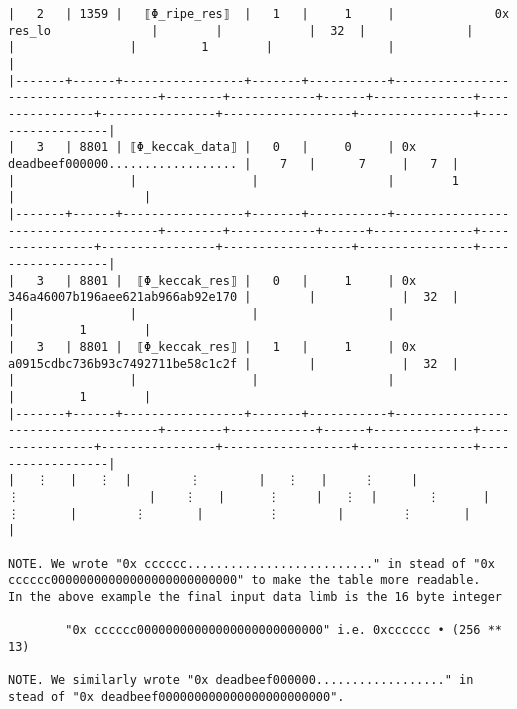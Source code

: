 \documentclass[varwidth=\maxdimen,margin=0.5cm,multi={verbatim}]{standalone}
\begin{document}
\begin{verbatim}
|   2   | 1359 |   ⟦Φ_ripe_res⟧  |   1   |     1     |              0x res_lo              |        |            |  32  |              |                |                |         1        |                |                  |
|-------+------+-----------------+-------+-----------+-------------------------------------+--------+------------+------+--------------+----------------+----------------+------------------+----------------+------------------|
|   3   | 8801 | ⟦Φ_keccak_data⟧ |   0   |     0     | 0x deadbeef000000.................. |    7   |      7     |   7  |              |                |                |                  |        1       |                  |
|-------+------+-----------------+-------+-----------+-------------------------------------+--------+------------+------+--------------+----------------+----------------+------------------+----------------+------------------|
|   3   | 8801 |  ⟦Φ_keccak_res⟧ |   0   |     1     | 0x 346a46007b196aee621ab966ab92e170 |        |            |  32  |              |                |                |                  |                |         1        |
|   3   | 8801 |  ⟦Φ_keccak_res⟧ |   1   |     1     | 0x a0915cdbc736b93c7492711be58c1c2f |        |            |  32  |              |                |                |                  |                |         1        |
|-------+------+-----------------+-------+-----------+-------------------------------------+--------+------------+------+--------------+----------------+----------------+------------------+----------------+------------------|
|   ⋮   |   ⋮  |        ⋮        |   ⋮   |     ⋮     |                  ⋮                  |    ⋮   |      ⋮     |   ⋮  |       ⋮      |        ⋮       |        ⋮       |         ⋮        |        ⋮       |                  |

NOTE. We wrote "0x cccccc.........................." in stead of "0x cccccc00000000000000000000000000" to make the table more readable.
In the above example the final input data limb is the 16 byte integer

        "0x cccccc00000000000000000000000000" i.e. 0xcccccc • (256 ** 13) 

NOTE. We similarly wrote "0x deadbeef000000.................." in stead of "0x deadbeef000000000000000000000000".

\end{verbatim}
\end{document}
